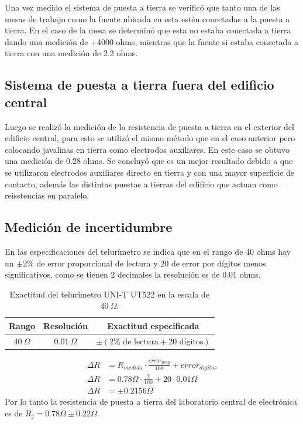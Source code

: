 Una vez medido el sistema de puesta a tierra se verificó que tanto una de las mesas de trabajo como la fuente ubicada en esta estén conectadas a la puesta a tierra. En el caso de la mesa se determinó que esta no estaba conectada a tierra dando una medición de +4000 ohms, mientras que la fuente si estaba conectada a tierra con una medición de 2.2 ohms.

\subsection{Sistema de puesta a tierra fuera del edificio central}
Luego se realizó la medición de la resistencia de puesta a tierra en el exterior del edificio central, para esto se utilizó el mismo método que en el caso anterior pero colocando javalinas en tierra como electrodos auxiliares. En este caso se obtuvo una medición de 0.28 ohms. Se concluyó que es un mejor resultado debido a que se utilizaron electrodos auxiliares directo en tierra y con una mayor superficie de contacto, además las distintas puestas a tierras del edificio que actuan como reisstencias en paralelo.

\subsection{Medición de incertidumbre}

En las especificaciones del telurímetro se indica que en el rango de 40 ohms hay un $\pm 2\%$ de error proporcional de lectura y 20 de error por dígitos menos significativos, como se tienen 2 decimales la resolución es de 0.01 ohms.

\begin{table}[H]
\centering
\begingroup
\renewcommand{\tablename}{Tabla}
\caption{Exactitud del telurímetro UNI-T UT522 en la escala de $40\ \Omega$.}
\label{tab:especificaciones_telurimetro}
\endgroup
\renewcommand{\arraystretch}{1.4}
\begin{tabular}{|c|c|c|}
\hline 
\textbf{Rango} & \textbf{Resolución} & \textbf{Exactitud especificada} \\ \hline
$40\ \Omega$ & $0.01\ \Omega$ & $\pm (2\%\text{ de lectura} + 20\text{ dígitos})$ \\ \hline
\end{tabular}
\end{table}

\begin{equation*}
\begin{split}
    \Delta R &= R_{medida} \cdot \frac{error_{prop}}{100} + error_{digitos} \\
    \Delta R &= 0.78\Omega \cdot \frac{2}{100} + 20 \cdot 0.01\Omega \\
    \Delta R &= \pm0.2156\Omega
\end{split}
\end{equation*}
Por lo tanto la resistencia de puesta a tierra del laboratorio central de electrónica es de $R_j = 0.78\Omega \pm 0.22\Omega$. \\

